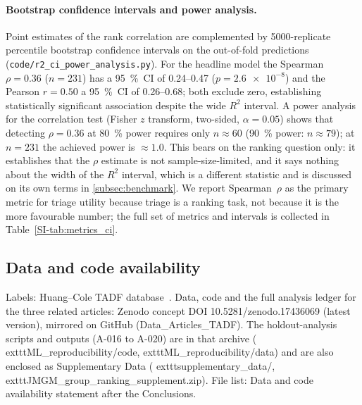 \paragraph{Bootstrap confidence intervals and power analysis.}
Point estimates of the rank correlation are complemented by
\num{5000}-replicate percentile bootstrap confidence intervals on the
out-of-fold predictions (\texttt{code/r2\_ci\_power\_analysis.py}).
For the headline model the Spearman $\rho = 0.36$ ($n = 231$) has a \qty{95}{\percent}~CI of
\numrange{0.24}{0.47} ($p = \num{2.6e-8}$) and the Pearson $r = 0.50$ a \qty{95}{\percent}~CI
of \numrange{0.26}{0.68}; both exclude zero, establishing statistically
significant association despite the wide $R^2$ interval.
A power analysis for the correlation test (Fisher $z$ transform, two-sided,
$\alpha = 0.05$) shows that detecting $\rho = 0.36$ at \qty{80}{\percent} power
requires only $n \approx 60$ (\qty{90}{\percent} power: $n \approx 79$); at
$n = 231$ the achieved power is $\approx 1.0$. This bears on the ranking question only:
it establishes that the $\rho$ estimate is not sample-size-limited, and it says nothing
about the width of the $R^2$ interval, which is a different statistic and is discussed on
its own terms in \cref{subsec:benchmark}. We report Spearman~$\rho$ as the primary metric
for triage utility because triage is a ranking task, not because it is the more favourable
number; the full set of metrics and intervals is collected in
Table~\ref{SI-tab:metrics_ci}.

\subsection{Data and code availability}

Labels: Huang--Cole TADF database~\cite{HuangCole2024}. Data, code and the full
analysis ledger for the three related articles: Zenodo concept DOI 10.5281/zenodo.17436069
(latest version), mirrored on GitHub (Data\_Articles\_TADF). The holdout-analysis scripts
and outputs (A-016 to A-020) are in that archive (	exttt{ML\_reproducibility/code},
	exttt{ML\_reproducibility/data}) and are also enclosed as Supplementary Data
(	exttt{supplementary\_data/}, 	exttt{JMGM\_group\_ranking\_supplement.zip}). File list: Data and code
availability statement after the Conclusions.
